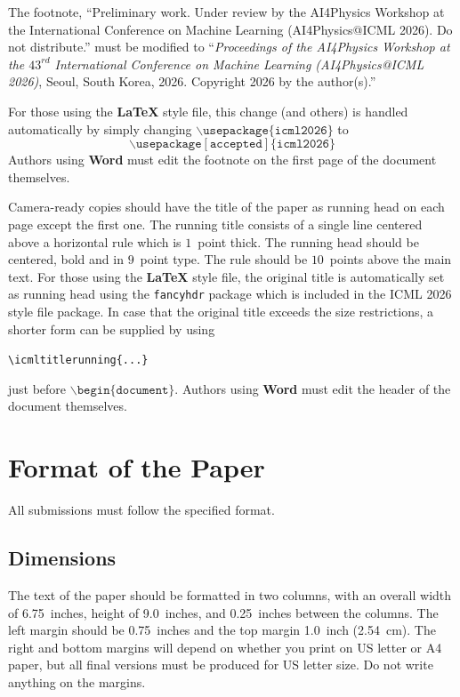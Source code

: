 \documentclass{article}
\theoremstyle{plain}
\theoremstyle{definition}
\theoremstyle{remark}
\begin{document}
The footnote, ``Preliminary work. Under review by the
AI4Physics Workshop at the International Conference on Machine Learning (AI4Physics@ICML 2026). Do not distribute.'' must be
modified to ``\textit{Proceedings of the
  AI4Physics Workshop at the
  $\mathit{43}^{rd}$ International Conference on Machine Learning (AI4Physics@ICML 2026)},
Seoul, South Korea, 2026.
Copyright 2026 by the author(s).''

For those using the \textbf{\LaTeX} style file, this change (and others) is
handled automatically by simply changing
$\mathtt{\backslash usepackage\{icml2026\}}$ to
$$\mathtt{\backslash usepackage[accepted]\{icml2026\}}$$
Authors using \textbf{Word} must edit the
footnote on the first page of the document themselves.

Camera-ready copies should have the title of the paper as running head
on each page except the first one. The running title consists of a
single line centered above a horizontal rule which is $1$~point thick.
The running head should be centered, bold and in $9$~point type. The
rule should be $10$~points above the main text. For those using the
\textbf{\LaTeX} style file, the original title is automatically set as running
head using the \texttt{fancyhdr} package which is included in the ICML
2026 style file package. In case that the original title exceeds the
size restrictions, a shorter form can be supplied by using

\verb|\icmltitlerunning{...}|

just before $\mathtt{\backslash begin\{document\}}$.
Authors using \textbf{Word} must edit the header of the document themselves.

\section{Format of the Paper}

All submissions must follow the specified format.

\subsection{Dimensions}

The text of the paper should be formatted in two columns, with an
overall width of 6.75~inches, height of 9.0~inches, and 0.25~inches
between the columns. The left margin should be 0.75~inches and the top
margin 1.0~inch (2.54~cm). The right and bottom margins will depend on
whether you print on US letter or A4 paper, but all final versions
must be produced for US letter size.
Do not write anything on the margins.
\end{document}
